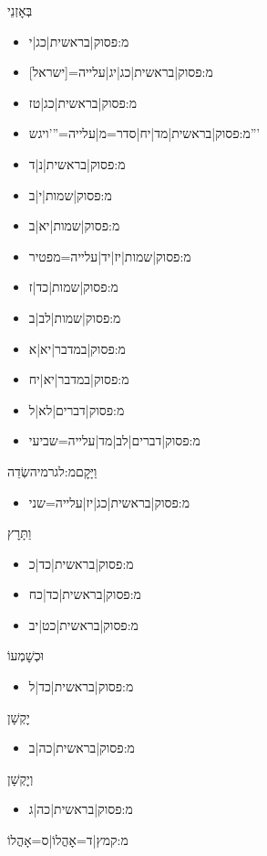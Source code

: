 \begin{itemize}
{{{{{{{{{{\begin{itemize}
\end{itemize}
 \item בְּאׇזְנֵי
\begin{itemize} \item {{מ:פסוק|בראשית|כג|י}}\item {{מ:פסוק|בראשית|כג|יג|עלייה=[ישראל]}}\item {{מ:פסוק|בראשית|כג|טז}}\item {{מ:פסוק|בראשית|מד|יח|סדר=מ|עלייה='''ויגש'''}}\item {{מ:פסוק|בראשית|נ|ד}}\item {{מ:פסוק|שמות|י|ב}}\item {{מ:פסוק|שמות|יא|ב}}\item {{מ:פסוק|שמות|יז|יד|עלייה=מפטיר}}\item {{מ:פסוק|שמות|כד|ז}}\item {{מ:פסוק|שמות|לב|ב}}\item {{מ:פסוק|במדבר|יא|א}}\item {{מ:פסוק|במדבר|יא|יח}}\item {{מ:פסוק|דברים|לא|ל}}\item {{מ:פסוק|דברים|לב|מד|עלייה=שביעי}}
\end{itemize}
 \item וַיָּקׇם{{מ:לגרמיה}}שְׂדֵה
\begin{itemize} \item {{מ:פסוק|בראשית|כג|יז|עלייה=שני}}
\end{itemize}
 \item וַתָּרׇץ
\begin{itemize} \item {{מ:פסוק|בראשית|כד|כ}}\item {{מ:פסוק|בראשית|כד|כח}}\item {{מ:פסוק|בראשית|כט|יב}}
\end{itemize}
 \item וּכְשׇׁמְעוֹ
\begin{itemize} \item {{מ:פסוק|בראשית|כד|ל}}
\end{itemize}
 \item יׇקְשָׁן
\begin{itemize} \item {{מ:פסוק|בראשית|כה|ב}}
\end{itemize}
 \item וְיׇקְשָׁן
\begin{itemize} \item {{מ:פסוק|בראשית|כה|ג}}
\end{itemize}
 \item {{מ:קמץ|ד=אׇהֳלוֹ|ס=אָהֳלוֹ}}
}}}}}}}}}}
\end{itemize}
